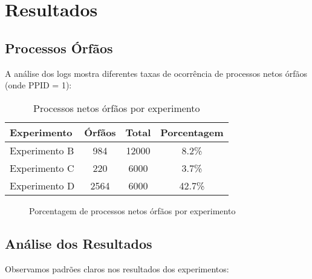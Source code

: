\documentclass[a4paper,12pt]{article}
\begin{document}
\section{Resultados}

\subsection{Processos Órfãos}

A análise dos logs mostra diferentes taxas de ocorrência de processos netos órfãos (onde PPID = 1):

\begin{table}[H]
\centering
\begin{tabular}{@{}lccc@{}}
\toprule
\textbf{Experimento} & \textbf{Órfãos} & \textbf{Total} & \textbf{Porcentagem} \\
\midrule
Experimento B & 984 & 12000 & 8.2\% \\
Experimento C & 220 & 6000 & 3.7\% \\
Experimento D & 2564 & 6000 & 42.7\% \\
\bottomrule
\end{tabular}
\caption{Processos netos órfãos por experimento}
\label{tab:orphans}
\end{table}

\begin{figure}[H]
\centering
{}
\caption{Porcentagem de processos netos órfãos por experimento}
\label{fig:orphans}
\end{figure}

\subsection{Análise dos Resultados}

Observamos padrões claros nos resultados dos experimentos:
\end{document}
